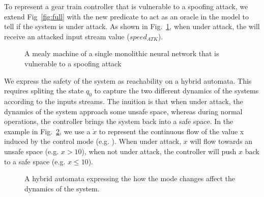 To represent a gear train controller that is vulnerable to a spoofing attack, we extend Fig~\ref{fig:full} with the new predicate \isUnderAttack to act as an oracle in the model to tell if the system is under attack.
As shown in Fig.~\ref{fig:fullAtk}, when under attack, the \fullNN will receive an attacked input stream value ($speed_{ATK}$).

\begin{figure}[h!]
\centering
{}
\caption{A mealy machine of a single monolithic neural network that is vulnerable to a spoofing attack}
\label{fig:fullAtk}
\end{figure}

We express the safety of the system as reachability on a hybrid automata.
This requires spliting the state $q_0$ to capture the two different dynamics of the systems according to the inputs streams.
The inuition is that when under attack, the dynamics of the system approach some unsafe space, whereas during normal operations, the controller brings the system back into a safe space.
In the example in Fig.~\ref{fig:hybridGear}, we use a $\dot{x}$ to represent the continuous flow of the value x induced by the control mode (e.g. \fullNN).
When under attack, $x$ will flow towards an unsafe space (e.g. $x > 10$), when not under attack, the controller will push $x$ back to a safe space (e.g. $x\leq 10$).


\begin{figure}[h!]
\centering
{}
\caption{A hybrid automata expressing the how the mode changes affect the dynamics of the system.}
\label{fig:hybridGear}
\end{figure}

